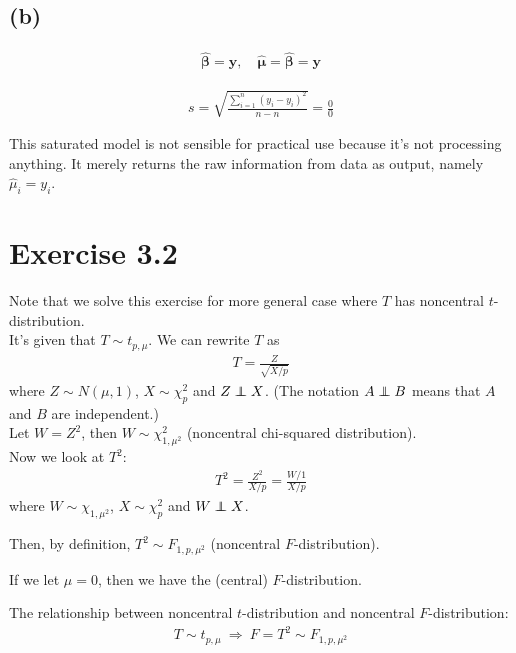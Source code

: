 \documentclass[a4paper]{article}
\newcommand\independent{\protect\mathpalette{\protect\independenT}{\perp}}
\def\independenT#1#2{\mathrel{\rlap{$#1#2$}\mkern2mu{#1#2}}}
\begin{document}
\subsection{(b)}
\begin{align*}
\widehat{\bm{\beta}} = \bm{y}, \quad \widehat{\bm{\mu}} = \widehat{\bm{\beta}} = \bm{y}
\end{align*}

\begin{align*}
s = \sqrt{\frac{\sum_{i=1}^{n} (y_{i} - y_{i})^{2}}{n-n}} = \frac{0}{0}
\end{align*}

This saturated model is not sensible for practical use because it's not processing anything. It merely returns the raw information from data as output, namely $\widehat{\mu}_{i} = y_{i}$.


\vspace{\baselineskip}
\section{Exercise 3.2}
Note that we solve this exercise for more general case where $T$ has noncentral $t$-distribution.\\

It's given that $T \sim t_{p,\mu}$. We can rewrite $T$ as
\begin{align*}
T = \frac{Z}{\sqrt{X/p}}
\end{align*}
where $Z \sim N(\mu, 1)$, $X \sim \chi_{p}^2$ and $Z \independent X$. (The notation $A \independent B$ means that $A$ and $B$ are independent.)\\
Let $W = Z^2$, then $W \sim \chi_{1, \mu^2}^2$ (noncentral chi-squared distribution).\\

Now we look at $T^2$:
\begin{align*}
T^2 = \frac{Z^2}{X/p} = \frac{W/1}{X/p}
\end{align*}
where $W \sim \chi_{1, \mu^2}$, $X \sim \chi_{p}^2$ and $W \independent X$.

Then, by definition, $T^2 \sim F_{1,p,\mu^2}$ (noncentral $F$-distribution).

If we let $\mu = 0$, then we have the (central) $F$-distribution.

\vspace{\baselineskip}
\vspace{\baselineskip}
\begin{framed}
The relationship between noncentral $t$-distribution and noncentral $F$-distribution:
\begin{align*}
T \sim t_{p, \mu} ~ \Rightarrow ~ F = T^2 \sim F_{1,p,\mu^2}
\end{align*}
\end{framed}
\end{document}
